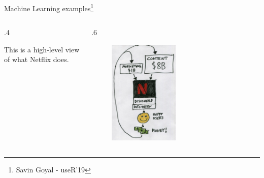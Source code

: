 \documentclass[
  9pt,
  ignorenonframetext,
  aspectratio=169,
  t, dvipsnames]{beamer}
\theoremstyle{definition}
\def\begincols{\begin{columns}}
\def\begincol{\begin{column}}
\def\endcol{\end{column}}
\def\endcols{\end{columns}}
\begin{document}
\begin{frame}{Machine Learning examples\footnote{Savin Goyal - useR'19}}
\protect\hypertarget{machine-learning-examples-1}{}
\begincols
\begincol{.4\textwidth}

This is a high-level view of what Netflix does. \endcol

\begincol{.6\textwidth}

\begin{figure}

{\centering \includegraphics[width=0.5\textwidth,height=\textheight]{img/netflix1.png}

}

\end{figure}

\endcol
\endcols
\end{frame}
\end{document}
